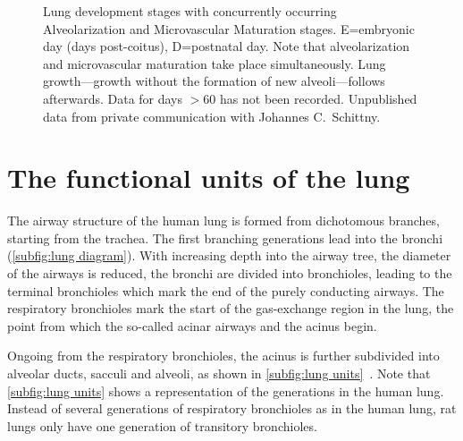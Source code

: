 \begin{figure}[htb]
	\noindent\makebox[\textwidth]{%
		\centering%
		}%
	\caption[Lung development stages, revised paradigm]{Lung development stages with concurrently occurring Alveolarization and Microvascular Maturation stages. E=embryonic day (days post-coitus), D=postnatal day. Note that alveolarization and microvascular maturation take place simultaneously. Lung growth---growth without the formation of new alveoli---follows afterwards. Data for days $>$60 has not been recorded. Unpublished data from private communication with Johannes C.\ Schittny.}
	\label{fig:lung development stages new}
\end{figure}

\section{The functional units of the lung}\label{sec:functional units of the lung}
The airway structure of the human lung is formed from dichotomous branches, starting from the trachea. The first branching generations lead into the bronchi (\autoref{subfig:lung diagram}). With increasing depth into the airway tree, the diameter of the airways is reduced, the bronchi are divided into bronchioles, leading to the terminal bronchioles which mark the end of the purely conducting airways. The respiratory bronchioles mark the start of the gas-exchange region in the lung, the point from which the so-called acinar airways and the acinus begin. 

Ongoing from the respiratory bronchioles, the acinus is further subdivided into alveolar ducts, sacculi and alveoli, as shown in \autoref{subfig:lung units}~\cite{Haefeli-Bleuer1988,Weibel1963,Weibel2009,Schittny2007a}. Note that \autoref{subfig:lung units} shows a representation of the generations in the human lung. Instead of several generations of respiratory bronchioles as in the human lung, rat lungs only have one generation of transitory bronchioles.


